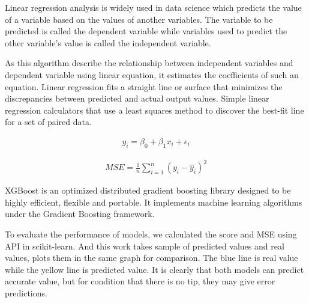\documentclass[11pt]{article}
\begin{document}
Linear regression analysis is widely used in data science which predicts the value of a variable based on the values of another variables. The variable to be predicted is called the dependent variable while variables used to predict the other variable's value is called the independent variable.\cite{ref4}

As this algorithm describe the relationship between independent variables and dependent variable using linear equation, it estimates the coefficients of such an equation. Linear regression fits a straight line or surface that minimizes the discrepancies between predicted and actual output values. Simple linear regression calculators that use a least squares method to discover the best-fit line for a set of paired data.

\begin{align}
    y_{i}=\beta _{0}+\beta _{1}x_{i}+\epsilon _{i}
\end{align}

\begin{align}
    MSE=\frac{1}{n}\sum_{i=1}^{n}(y_{i}-\hat{y}_{i} )^{2} 
\end{align}

XGBoost is an optimized distributed gradient boosting library designed to be highly efficient, flexible and portable. It implements machine learning algorithms under the Gradient Boosting framework.\cite{ref3}

To evaluate the performance of models, we calculated the score and MSE using API in scikit-learn. And this work takes sample of predicted values and real values, plots them in the same graph for comparison. The blue line is real value while the yellow line is predicted value. It is clearly that both models can predict accurate value, but for condition that there is no tip, they may give error predictions.
\end{document}
